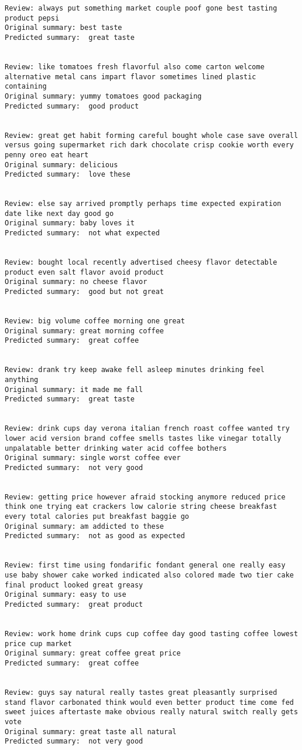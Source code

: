\documentclass[11pt]{article}
\begin{document}
\begin{Verbatim}[commandchars=\\\{\}]
Review: always put something market couple poof gone best tasting product pepsi 
Original summary: best taste 
Predicted summary:  great taste


Review: like tomatoes fresh flavorful also come carton welcome alternative metal cans impart flavor sometimes lined plastic containing 
Original summary: yummy tomatoes good packaging 
Predicted summary:  good product


Review: great get habit forming careful bought whole case save overall versus going supermarket rich dark chocolate crisp cookie worth every penny oreo eat heart 
Original summary: delicious 
Predicted summary:  love these


Review: else say arrived promptly perhaps time expected expiration date like next day good go 
Original summary: baby loves it 
Predicted summary:  not what expected


Review: bought local recently advertised cheesy flavor detectable product even salt flavor avoid product 
Original summary: no cheese flavor 
Predicted summary:  good but not great


Review: big volume coffee morning one great 
Original summary: great morning coffee 
Predicted summary:  great coffee


Review: drank try keep awake fell asleep minutes drinking feel anything 
Original summary: it made me fall 
Predicted summary:  great taste


Review: drink cups day verona italian french roast coffee wanted try lower acid version brand coffee smells tastes like vinegar totally unpalatable better drinking water acid coffee bothers 
Original summary: single worst coffee ever 
Predicted summary:  not very good


Review: getting price however afraid stocking anymore reduced price think one trying eat crackers low calorie string cheese breakfast every total calories put breakfast baggie go 
Original summary: am addicted to these 
Predicted summary:  not as good as expected


Review: first time using fondarific fondant general one really easy use baby shower cake worked indicated also colored made two tier cake final product looked great greasy 
Original summary: easy to use 
Predicted summary:  great product


Review: work home drink cups cup coffee day good tasting coffee lowest price cup market 
Original summary: great coffee great price 
Predicted summary:  great coffee


Review: guys say natural really tastes great pleasantly surprised stand flavor carbonated think would even better product time come fed sweet juices aftertaste make obvious really natural switch really gets vote 
Original summary: great taste all natural 
Predicted summary:  not very good



\end{Verbatim}
\end{document}
